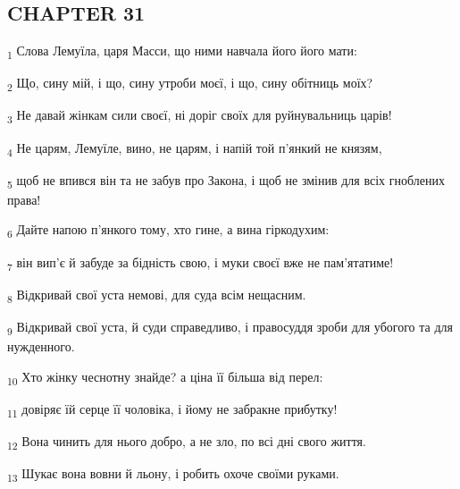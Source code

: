\subsection{CHAPTER 31}
\begin{tcolorbox}
\textsubscript{1} Слова Лемуїла, царя Масси, що ними навчала його його мати:
\end{tcolorbox}
\begin{tcolorbox}
\textsubscript{2} Що, сину мій, і що, сину утроби моєї, і що, сину обітниць моїх?
\end{tcolorbox}
\begin{tcolorbox}
\textsubscript{3} Не давай жінкам сили своєї, ні доріг своїх для руйнувальниць царів!
\end{tcolorbox}
\begin{tcolorbox}
\textsubscript{4} Не царям, Лемуїле, вино, не царям, і напій той п'янкий не князям,
\end{tcolorbox}
\begin{tcolorbox}
\textsubscript{5} щоб не впився він та не забув про Закона, і щоб не змінив для всіх гноблених права!
\end{tcolorbox}
\begin{tcolorbox}
\textsubscript{6} Дайте напою п'янкого тому, хто гине, а вина гіркодухим:
\end{tcolorbox}
\begin{tcolorbox}
\textsubscript{7} він вип'є й забуде за бідність свою, і муки своєї вже не пам'ятатиме!
\end{tcolorbox}
\begin{tcolorbox}
\textsubscript{8} Відкривай свої уста немові, для суда всім нещасним.
\end{tcolorbox}
\begin{tcolorbox}
\textsubscript{9} Відкривай свої уста, й суди справедливо, і правосуддя зроби для убогого та для нужденного.
\end{tcolorbox}
\begin{tcolorbox}
\textsubscript{10} Хто жінку чеснотну знайде? а ціна її більша від перел:
\end{tcolorbox}
\begin{tcolorbox}
\textsubscript{11} довіряє їй серце її чоловіка, і йому не забракне прибутку!
\end{tcolorbox}
\begin{tcolorbox}
\textsubscript{12} Вона чинить для нього добро, а не зло, по всі дні свого життя.
\end{tcolorbox}
\begin{tcolorbox}
\textsubscript{13} Шукає вона вовни й льону, і робить охоче своїми руками.
\end{tcolorbox}
